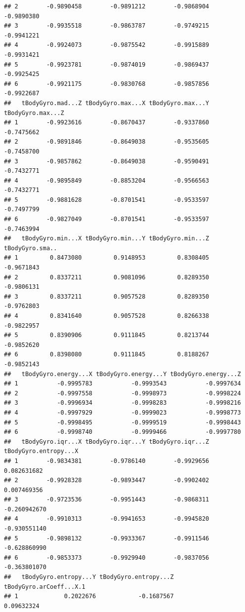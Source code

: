\documentclass[
]{article}
\begin{document}
\begin{verbatim}
## 2        -0.9890458        -0.9891212        -0.9868904        -0.9890380
## 3        -0.9935518        -0.9863787        -0.9749215        -0.9941221
## 4        -0.9924073        -0.9875542        -0.9915889        -0.9931421
## 5        -0.9923781        -0.9874019        -0.9869437        -0.9925425
## 6        -0.9921175        -0.9830768        -0.9857856        -0.9922687
##   tBodyGyro.mad...Z tBodyGyro.max...X tBodyGyro.max...Y tBodyGyro.max...Z
## 1        -0.9923616        -0.8670437        -0.9337860        -0.7475662
## 2        -0.9891846        -0.8649038        -0.9535605        -0.7458700
## 3        -0.9857862        -0.8649038        -0.9590491        -0.7432771
## 4        -0.9895849        -0.8853204        -0.9566563        -0.7432771
## 5        -0.9881628        -0.8701541        -0.9533597        -0.7497799
## 6        -0.9827049        -0.8701541        -0.9533597        -0.7463994
##   tBodyGyro.min...X tBodyGyro.min...Y tBodyGyro.min...Z tBodyGyro.sma..
## 1         0.8473080         0.9148953         0.8308405      -0.9671843
## 2         0.8337211         0.9081096         0.8289350      -0.9806131
## 3         0.8337211         0.9057528         0.8289350      -0.9762803
## 4         0.8341640         0.9057528         0.8266338      -0.9822957
## 5         0.8390906         0.9111845         0.8213744      -0.9852620
## 6         0.8398080         0.9111845         0.8188267      -0.9852143
##   tBodyGyro.energy...X tBodyGyro.energy...Y tBodyGyro.energy...Z
## 1           -0.9995783           -0.9993543           -0.9997634
## 2           -0.9997558           -0.9998973           -0.9998224
## 3           -0.9996934           -0.9998283           -0.9998216
## 4           -0.9997929           -0.9999023           -0.9998773
## 5           -0.9998495           -0.9999519           -0.9998443
## 6           -0.9998740           -0.9999466           -0.9997780
##   tBodyGyro.iqr...X tBodyGyro.iqr...Y tBodyGyro.iqr...Z tBodyGyro.entropy...X
## 1        -0.9834381        -0.9786140        -0.9929656           0.082631682
## 2        -0.9928328        -0.9893447        -0.9902402           0.007469356
## 3        -0.9723536        -0.9951443        -0.9868311          -0.260942670
## 4        -0.9910313        -0.9941653        -0.9945820          -0.930551140
## 5        -0.9898132        -0.9933367        -0.9911546          -0.628860990
## 6        -0.9853373        -0.9929940        -0.9837056          -0.363801070
##   tBodyGyro.entropy...Y tBodyGyro.entropy...Z tBodyGyro.arCoeff...X.1
## 1             0.2022676            -0.1687567              0.09632324

\end{verbatim}
\end{document}
